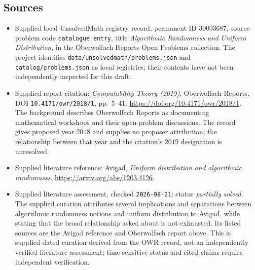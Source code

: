 \documentclass[11pt]{article}
\begin{document}
\subsection{Sources}
\begin{itemize}
\item Supplied local UnsolvedMath registry record, permanent ID \(30003687\), source problem code \texttt{catalogue entry}, title \emph{Algorithmic Randomness and Uniform Distribution}, in the Oberwolfach Reports Open Problems collection. The project identifies \texttt{data/unsolvedmath/problems.json} and \texttt{catalog/problems.json} as local registries; their contents have not been independently inspected for this draft.
\item Supplied report citation: \emph{Computability Theory (2019)}, Oberwolfach Reports, DOI \texttt{10.4171/owr/2018/1}, pp.\ 5--41. \url{https://doi.org/10.4171/owr/2018/1}. The background describes Oberwolfach Reports as documenting mathematical workshops and their open-problem discussions. The record gives proposed year \(2018\) and supplies no proposer attribution; the relationship between that year and the citation's \(2019\) designation is unresolved.
\item Supplied literature reference: Avigad, \emph{Uniform distribution and algorithmic randomness}. \url{https://arxiv.org/abs/1203.4126}.
\item Supplied literature assessment, checked \texttt{2026-08-21}: status \emph{partially solved}. The supplied curation attributes several implications and separations between algorithmic randomness notions and uniform distribution to Avigad, while stating that the broad relationship asked about is not exhausted. Its listed sources are the Avigad reference and Oberwolfach report above. This is supplied dated curation derived from the OWR record, not an independently verified literature assessment; time-sensitive status and cited claims require independent verification.
\end{itemize}
\end{document}
